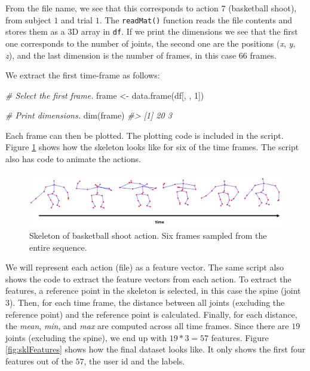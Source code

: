 \documentclass[
  11pt,
]{krantz}
\newenvironment{Shaded}{\begin{snugshade}}{\end{snugshade}}
\newcommand{\CommentTok}[1]{\textcolor[rgb]{0.37,0.37,0.37}{\textit{#1}}}
\newcommand{\DecValTok}[1]{\textcolor[rgb]{0.06,0.06,0.06}{#1}}
\newcommand{\FunctionTok}[1]{\textcolor[rgb]{0,0,0}{#1}}
\newcommand{\NormalTok}[1]{#1}
\newcommand{\OtherTok}[1]{\textcolor[rgb]{0.37,0.37,0.37}{#1}}
\begin{document}
From the file name, we see that this corresponds to action \(7\) (basketball shoot), from subject \(1\) and trial \(1\). The \texttt{readMat()} function reads the file contents and stores them as a \(3\)D array in \texttt{df}. If we print the dimensions we see that the first one corresponds to the number of joints, the second one are the positions (\emph{x}, \emph{y}, \emph{z}), and the last dimension is the number of frames, in this case \(66\) frames.

We extract the first time-frame as follows:

\begin{Shaded}
\begin{Highlighting}[]
\CommentTok{\# Select the first frame.}
\NormalTok{frame }\OtherTok{\textless{}{-}} \FunctionTok{data.frame}\NormalTok{(df[, , }\DecValTok{1}\NormalTok{])}

\CommentTok{\# Print dimensions.}
\FunctionTok{dim}\NormalTok{(frame)}
\CommentTok{\#\textgreater{} [1] 20  3}
\end{Highlighting}
\end{Shaded}

Each frame can then be plotted. The plotting code is included in the script. Figure \ref{fig:sklBasket} shows how the skeleton looks like for six of the time frames. The script also has code to animate the actions.

\begin{figure}

{\centering \includegraphics[width=1\linewidth]{images/skl_basket} 

}

\caption{Skeleton of basketball shoot action. Six frames sampled from the entire sequence.}\label{fig:sklBasket}
\end{figure}

We will represent each action (file) as a feature vector. The same script also shows the code to extract the feature vectors from each action. To extract the features, a reference point in the skeleton is selected, in this case the spine (joint \(3\)). Then, for each time frame, the distance between all joints (excluding the reference point) and the reference point is calculated. Finally, for each distance, the \emph{mean}, \emph{min}, and \emph{max} are computed across all time frames. Since there are \(19\) joints (excluding the spine), we end up with \(19*3=57\) features. Figure \ref{fig:sklFeatures} shows how the final dataset looks like. It only shows the first four features out of the \(57\), the user id and the labels.
\end{document}
